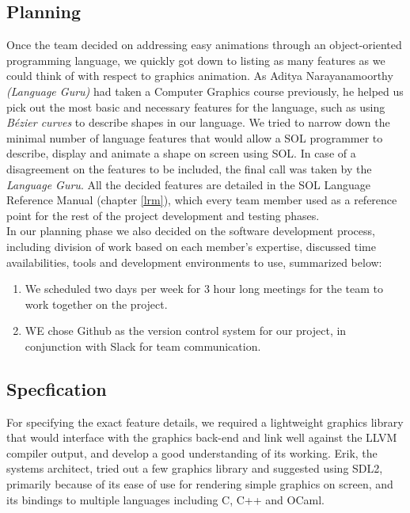\documentclass[letterpaper,12pt]{report}
\begin{document}
{    \subsection{Planning}
      Once the team decided on addressing easy animations through an object-oriented programming language, we quickly got down to listing as many features as we could think of with respect to graphics animation. As Aditya Narayanamoorthy \textit{(Language Guru)} had taken a Computer Graphics course previously, he helped us pick out the most basic and necessary features for the language, such as using \textit{B\'ezier curves} to describe shapes in our language. We tried to narrow down the minimal number of language features that would allow a SOL programmer to describe, display and animate a shape on screen using SOL. In case of a disagreement on the features to be included, the final call was taken by the \textit{Language Guru}. All the decided features are detailed in the SOL Language Reference Manual (chapter \ref{lrm}), which every team member used as a reference point for the rest of the project development and testing phases.\\

      In our planning phase we also decided on the software development process, including division of work based on each member's expertise, discussed time availabilities, tools and development environments to use, summarized below:
      \begin{enumerate}
        \itemsep 0em
        \item We scheduled two days per week for 3 hour long meetings for the team to work together on the project.
        \item WE chose Github as the version control system for our project, in conjunction with Slack for team communication.
      \end{enumerate}

    \subsection{Specfication}
      For specifying the exact feature details, we required a lightweight graphics library that would interface with the graphics back-end and link well against the LLVM compiler output, and develop a good understanding of its working. Erik, the systems architect, tried out a few graphics library and suggested using SDL2, primarily because of its ease of use for rendering simple graphics on screen, and its bindings to multiple languages including C, C++ and OCaml.\\

}
\end{document}
